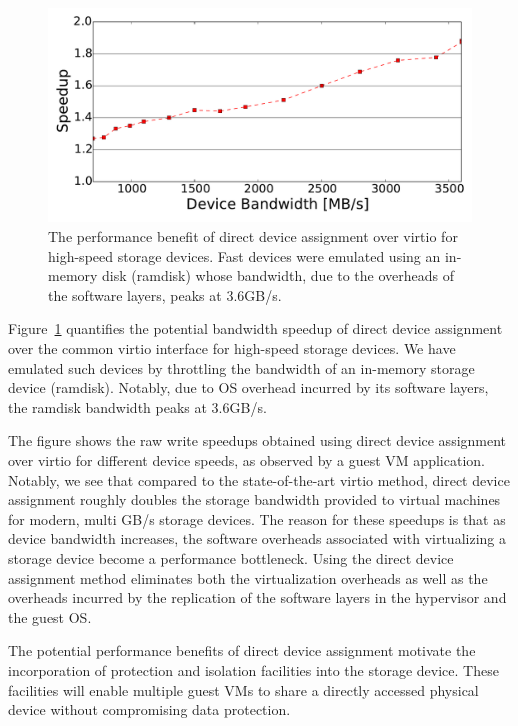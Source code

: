 
\begin{figure}[t]
  \centering
  \includegraphics[width=\columnwidth]{figs/motivation.pdf}
  \caption{The performance benefit of direct device assignment over virtio for high-speed storage devices. Fast devices were emulated using an in-memory disk (ramdisk) whose bandwidth, due to the overheads of the software layers, peaks at 3.6GB/s.
    \label{fig:directperf}}
  \end{figure}

Figure~\ref{fig:directperf} quantifies the potential bandwidth speedup of direct device assignment over the common virtio interface for high-speed storage devices. We have emulated such devices by throttling the bandwidth of an in-memory storage device (ramdisk). Notably, due to OS overhead incurred by its software layers, the ramdisk bandwidth peaks at 3.6GB/s.

The figure shows the raw write speedups obtained using direct device assignment over virtio for different device speeds, as observed by a guest VM application.
Notably, we see that compared to the state-of-the-art virtio method, direct device assignment roughly doubles the storage bandwidth provided to virtual machines for modern, multi GB/s storage devices.
The reason for these speedups is that as device bandwidth increases, the  software overheads associated with virtualizing a storage device become a performance bottleneck.
Using the direct device assignment method eliminates both the virtualization overheads as well as the overheads incurred by the replication of the software layers in the hypervisor and the guest OS.

The potential performance benefits of direct device assignment motivate the incorporation of protection and isolation facilities into the storage device. These facilities will enable multiple guest VMs to share a directly accessed physical device without compromising data protection.

